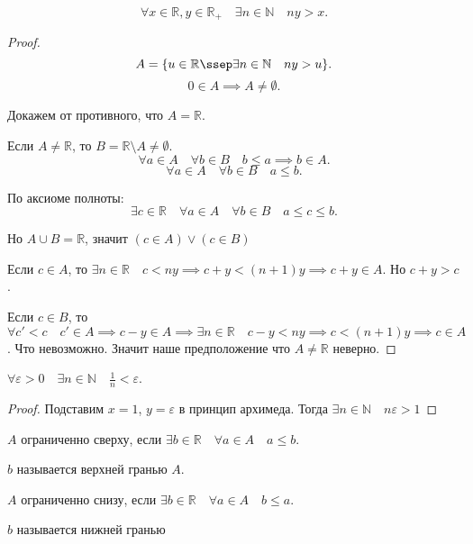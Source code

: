     \begin{theorem} 
        \[ \forall{x \in \mathbb{R}, y \in \mathbb{R}_+}\quad \exists{n \in \mathbb{N}}\quad ny>x .\]
        \begin{proof}
            \[ A = \{u \in \mathbb{R}\ssep \exists{n \in \mathbb{N}}\quad ny>u \}  .\]
            \[ 0 \in A \implies A \neq  \emptyset .\]
            
            Докажем от противного, что $A = \mathbb{R}$.

            Если $A \neq \mathbb{R}$, то $B = \mathbb{R}\setminus A \neq \emptyset$.
            \[ \forall{a \in A}\quad \forall{b \in B} \quad b\le a \implies b \in A .\] 
            \[ \forall{a \in A}\quad \forall{b \in B}\quad a\le b .\]
           
            По аксиоме полноты:
            \[ \exists{c \in \mathbb{R}}\quad \forall{a \in A}\quad \forall{b \in B}\quad a \le c \le b .\]
            
            Но $A\cup B = \mathbb{R}$, значит $\left( c \in A  \right)\lor\left( c \in B \right)  $
            
            Если $c \in A$, то $\exists{n \in \mathbb{R}}\quad c<ny \implies c+y< (n+1)y \implies c+y \in A$. Но $c+y>c$.
            
            Если  $c \in B$, то $\forall{c'<c }\quad c' \in A \implies c-y \in A \implies \exists{n \in \mathbb{R}}\quad c-y < ny \implies c<(n+1)y \implies c \in A$. Что невозможно. Значит наше предположение что  $A \neq \mathbb{R}$ неверно.
        \end{proof}
    \end{theorem}
    \begin{lemma} 
        $\forall{\varepsilon > 0}\quad \exists{n \in \mathbb{N}}\quad \frac{1}{n}<\varepsilon$.
        \begin{proof}
            Подставим $x=1$,  $y=\varepsilon$ в принцип архимеда. Тогда  $\exists{n \in \mathbb{N}}\quad n\varepsilon > 1$
        \end{proof}
    \end{lemma}
    \begin{definition} \slashns 

        $A$ ограниченно сверху, если $\exists{b \in \mathbb{R}}\quad \forall{a \in A}\quad a\le b$.

        $b$ называется верхней гранью  $A$.
    \end{definition}
    \begin{definition} \slashns
        
        $A$ ограниченно снизу, если $\exists{b \in \mathbb{R}}\quad \forall{a \in A}\quad b\le a$.

        $b$ называется нижней гранью
    \end{definition}
